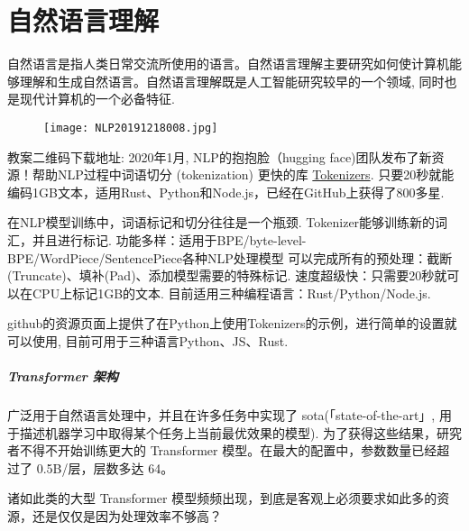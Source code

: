 \chapter{自然语言理解}\label{SSPChapter8}
\begin{tcolorbox}[colback=white!50,colframe=orange!50,title=自然语言]
\begin{center}
自然语言是指人类日常交流所使用的语言。自然语言理解主要研究如何使计算机能够理解和生成自然语言。自然语言理解既是人工智能研究较早的一个领域, 同时也是现代计算机的一个必备特征. \hfill
\end{center}
\end{tcolorbox}
\begin{figure}[H]
\centering
\texttt{[image: NLP20191218008.jpg]}
\end{figure}
教案二维码下载地址: 
2020年1月, NLP的抱抱脸（hugging face)团队发布了新资源！帮助NLP过程中词语切分 (tokenization) 更快的库 \href{https://github.com/huggingface/tokenizers}{Tokenizers}.
只要20秒就能编码1GB文本，适用Rust、Python和Node.js，已经在GitHub上获得了800多星.

在NLP模型训练中，词语标记和切分往往是一个瓶颈. Tokenizer能够训练新的词汇，并且进行标记.
功能多样：适用于BPE/byte-level-BPE/WordPiece/SentencePiece各种NLP处理模型
可以完成所有的预处理：截断(Truncate)、填补(Pad)、添加模型需要的特殊标记.
速度超级快：只需要20秒就可以在CPU上标记1GB的文本.
目前适用三种编程语言：Rust/Python/Node.js.

github的资源页面上提供了在Python上使用Tokenizers的示例，进行简单的设置就可以使用, 目前可用于三种语言Python、JS、Rust.
\paragraph{Transformer 架构}
广泛用于自然语言处理中，并且在许多任务中实现了 sota(「state-of-the-art」, 用于描述机器学习中取得某个任务上当前最优效果的模型).
为了获得这些结果，研究者不得不开始训练更大的 Transformer 模型。在最大的配置中，参数数量已经超过了 0.5B/层，层数多达 64。

诸如此类的大型 Transformer 模型频频出现，到底是客观上必须要求如此多的资源，还是仅仅是因为处理效率不够高？

